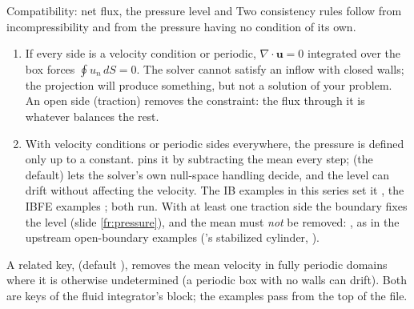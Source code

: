 \documentclass[aspectratio=169,11pt]{beamer}
\begin{document}
\begin{frame}{Compatibility: net flux, the pressure level and }
\label{fr:compat}
\footnotesize Two consistency rules follow from incompressibility and from the pressure having no condition of its own.
\begin{enumerate}
  \item {} If every side is a velocity condition or periodic, $\nabla\cdot\mathbf{u} = 0$ integrated over the box forces $\oint u_n\,dS = 0$. The solver cannot satisfy an inflow with closed walls; the projection will produce something, but not a solution of your problem. An open side (traction) removes the constraint: the flux through it is whatever balances the rest.
  \item {} With velocity conditions or periodic sides everywhere, the pressure is defined only up to a constant.  pins it by subtracting the mean every step;  (the default) lets the solver's own null-space handling decide, and the level can drift without affecting the velocity. The IB examples in this series set it , the IBFE examples ; both run. With at least one traction side the boundary fixes the level (slide \ref{fr:pressure}), and the mean must \emph{not} be removed: , as in the upstream open-boundary examples ('s stabilized cylinder, ).
\end{enumerate}
\vspace{1mm}
\begin{punchbox}
\footnotesize A related key,  (default ), removes the mean velocity in fully periodic domains where it is otherwise undetermined (a periodic box with no walls can drift). Both are keys of the fluid integrator's block; the examples pass  from the top of the file.
\end{punchbox}
\end{frame}
\end{document}
